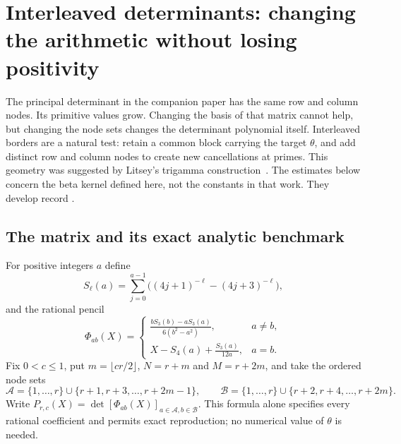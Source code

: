 \section{Interleaved determinants: changing the arithmetic without losing positivity}
\label{sec:interleaved-case}

The principal determinant in the companion paper has the same row and
column nodes. Its primitive values grow. Changing the basis of that
matrix cannot help, but changing the node sets changes the determinant
polynomial itself. Interleaved borders are a natural test: retain a
common block carrying the target $\theta$, and add distinct row and
column nodes to create new cancellations at primes. This geometry was
suggested by Litsey's trigamma construction~\cite{Litsey}. The estimates
below concern the beta kernel defined here, not the constants in that
work. They develop record .

\subsection{The matrix and its exact analytic benchmark}
For positive integers $a$ define
\[
 S_\ell(a)=\sum_{j=0}^{a-1}\bigl((4j+1)^{-\ell}-(4j+3)^{-\ell}\bigr),
\]
and the rational pencil
\begin{equation}\label{eq:frame-entry}
 \Phi_{ab}(X)=
 \begin{cases}
 \displaystyle\frac{bS_3(b)-aS_3(a)}{6(b^2-a^2)},&a\ne b,\\[5pt]
 \displaystyle X-S_4(a)+\frac{S_3(a)}{12a},&a=b.
 \end{cases}
\end{equation}
Fix $0<c\leq1$, put $m=\lfloor cr/2\rfloor$, $N=r+m$ and $M=r+2m$,
and take the ordered node sets
\[
 \mathcal A=\{1,\ldots,r\}\cup\{r+1,r+3,\ldots,r+2m-1\},\qquad
 \mathcal B=\{1,\ldots,r\}\cup\{r+2,r+4,\ldots,r+2m\}.
\]
Write $P_{r,c}(X)=\det[\Phi_{ab}(X)]_{a\in\mathcal A,b\in\mathcal B}$.
This formula alone specifies every rational coefficient and permits
exact reproduction; no numerical value of $\theta$ is needed.

